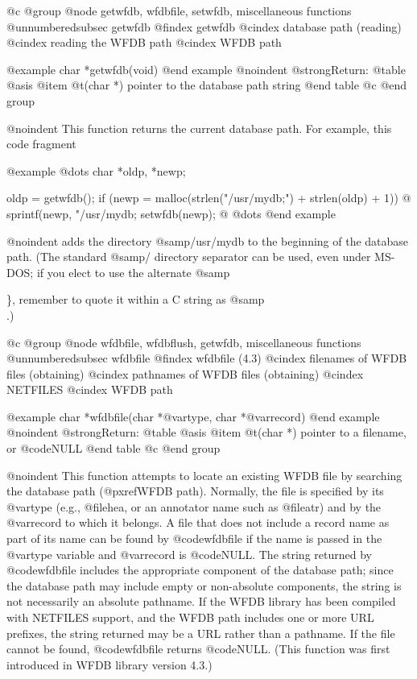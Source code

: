 {{{{{{{{{@c @group
@node     getwfdb, wfdbfile, setwfdb, miscellaneous functions
@unnumberedsubsec getwfdb
@findex getwfdb
@cindex database path (reading)
@cindex reading the WFDB path
@cindex WFDB path

@example
char *getwfdb(void)
@end example
@noindent
@strong{Return:}
@table @asis
@item @t{(char *)}
pointer to the database path string
@end table
@c @end group

@noindent
This function returns the current database path.  For example, this code
fragment

@example
@dots{}
char *oldp, *newp;

oldp = getwfdb();
if (newp = malloc(strlen("/usr/mydb;") + strlen(oldp) + 1)) @{
    sprintf(newp, "/usr/mydb;%
    setwfdb(newp);
@}
@dots{}
@end example

@noindent
adds the directory @samp{/usr/mydb} to the beginning of the database path.
(The standard @samp{/} directory separator can be used, even under MS-DOS; if
you elect to use the alternate @samp{\}, remember to quote it within a C string
as @samp{\\}.)

@c @group
@node     wfdbfile, wfdbflush, getwfdb, miscellaneous functions
@unnumberedsubsec wfdbfile
@findex wfdbfile (4.3)
@cindex filenames of WFDB files (obtaining)
@cindex pathnames of WFDB files (obtaining)
@cindex NETFILES
@cindex WFDB path

@example
char *wfdbfile(char *@var{type}, char *@var{record})
@end example
@noindent
@strong{Return:}
@table @asis
@item @t{(char *)}
pointer to a filename, or @code{NULL}
@end table
@c @end group

@noindent
This function attempts to locate an existing WFDB file by searching the
database path (@pxref{WFDB path}).  Normally, the file is specified by its
@var{type} (e.g., @file{hea}, or an annotator name such as @file{atr})
and by the @var{record} to which it belongs.  A file that does not include a
record name as part of its name can be found by @code{wfdbfile} if the name is
passed in the @var{type} variable and @var{record} is @code{NULL}.  The string
returned by @code{wfdbfile} includes the appropriate component of the database
path; since the database path may include empty or non-absolute components, the
string is not necessarily an absolute pathname.  If the WFDB library has been
compiled with NETFILES support, and the WFDB path includes one or more
URL prefixes, the string returned may be a URL rather than a pathname.  If the
file cannot be found, @code{wfdbfile} returns @code{NULL}.  (This function was
first introduced in WFDB library version 4.3.)

}}}}}}}}}}
